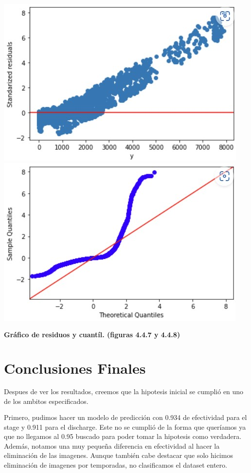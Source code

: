 \documentclass{article}
\begin{document}
                        \includegraphics[scale=0.6]{images/SVR_After_SS.jpg} 
                        \includegraphics[scale=0.6]{images/SVR_After_SS_Q.jpg}
                        \begin{center}
                            \textbf{Gráfico de residuos y cuantíl. (figuras 4.4.7 y 4.4.8)}
                        \end{center}

\section{Conclusiones Finales}

Despues de ver los resultados, creemos que la hipotesis inicial se cumplió en uno de los ambitos especificados.

Primero, pudimos hacer un modelo de predicción con 0.934 de efectividad para el stage y 0.911 para el discharge. Este no se cumplió de la forma que queríamos ya que no llegamos al 0.95 buscado para poder tomar la hipotesis como verdadera. Además, notamos una muy pequeña diferencia en efectividad al hacer la eliminación de las imagenes. Aunque también cabe destacar que solo hicimos eliminación de imagenes por temporadas, no clasificamos el dataset entero.
\end{document}
